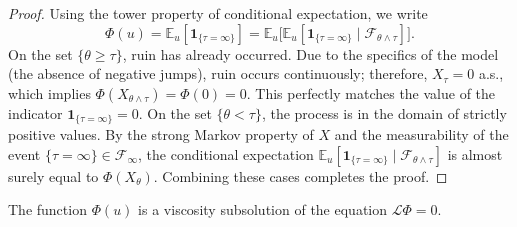 \documentclass[smallextended]{svjour3}
\begin{document}
\begin{proof}
Using the tower property of conditional expectation, we write
$$\Phi(u) = \mathbb{E}_u[\mathbf{1}_{\{\tau = \infty\}}] = \mathbb{E}_u \big[ \mathbb{E}_u[\mathbf{1}_{\{\tau = \infty\}} \mid \mathcal{F}_{\theta \wedge \tau}] \big].$$
On the set $\{\theta \ge \tau\}$, ruin has already occurred. Due to the specifics of the model (the absence of negative jumps), ruin occurs continuously; therefore, $X_\tau = 0$ a.s., which implies $\Phi(X_{\theta \wedge \tau}) = \Phi(0) = 0$. This perfectly matches the value of the indicator $\mathbf{1}_{\{\tau = \infty\}} = 0$.
On the set $\{\theta < \tau\}$, the process is in the domain of strictly positive values. By the strong Markov property of $X$ and the measurability of the event $\{\tau=\infty\} \in \mathcal{F}_\infty$, the conditional expectation $\mathbb{E}_u[\mathbf{1}_{\{\tau = \infty\}} \mid \mathcal{F}_{\theta \wedge \tau}]$ is almost surely equal to $\Phi(X_\theta)$. Combining these cases completes the proof.
\end{proof}

\begin{theorem}
The function $\Phi(u)$ is a viscosity subsolution of the equation $\mathcal{L} \Phi = 0$.
\end{theorem}
\end{document}
